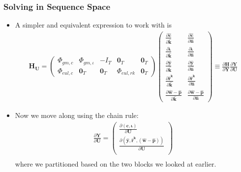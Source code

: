 \documentclass[english,xcolor=svgnames]{beamer}
\begin{document}
\begin{frame}
    \frametitle{Solving in Sequence Space}
		\begin{itemize}
			\item A simpler and equivalent expression to work with is
			\begin{align*}
				\mathbf{H}_{\mathbf{U}} = \begin{pmatrix}
					\Phi_{gm,c} & \Phi_{gm,\iota} & - I_T & \mathbf{0}_T & \mathbf{0}_T \\ 
					\Phi_{eul,c} & \mathbf{0}_T & \mathbf{0}_T & \Phi_{eul,rk} & \mathbf{0}_T  
				\end{pmatrix}
				\begin{pmatrix}
					\frac{\partial\mathbf{\hat{c}}}{\partial \mathbf{\hat{k}} } & \frac{\partial\mathbf{\hat{c}}}{\partial \mathbf{\hat{n}} } \\ \frac{\partial\mathbf{\hat{\iota}}}{\partial \mathbf{\hat{k}} } & \frac{\partial\mathbf{\hat{\iota}}}{\partial \mathbf{\hat{n}} } \\ \frac{\partial\mathbf{\hat{y}}}{\partial \mathbf{\hat{k}} } & \frac{\partial\mathbf{\hat{y}}}{\partial \mathbf{\hat{n}} } \\
					\frac{\partial\mathbf{\hat{r}^k}}{\partial \mathbf{\hat{k}} } & \frac{\partial\mathbf{\hat{r}^k}}{\partial \mathbf{\hat{n}} } \\
					\frac{\partial\mathbf{\hat{w}-\hat{p}}}{\partial \mathbf{\hat{k}} } &  \frac{\partial\mathbf{\hat{w}-\hat{p}}}{\partial \mathbf{\hat{n}} } 
				\end{pmatrix} \equiv \frac{\partial \mathbf{H}}{\partial \mathbf{Y}}\frac{\partial \mathbf{Y}}{\partial \mathbf{U}}
			\end{align*}
			\item Now we move along using the chain rule:
			\begin{align*}
				\frac{\partial \mathbf{Y}}{\partial \mathbf{U}} = \begin{pmatrix}
					\frac{\partial (\mathbf{c},\mathbf{\iota})}{\partial \mathbf{U}} \\
					\frac{\partial (\mathbf{\hat{y}},\mathbf{\hat{r}^k},\mathbf{(\hat{w}-\hat{p})})}{\partial \mathbf{U}}\\
				\end{pmatrix} \\
			\end{align*}
			where we partitioned based on the two blocks we looked at earlier.
		\end{itemize}
\end{frame}
\end{document}
